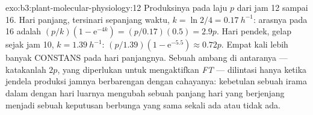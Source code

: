 \begin{solution}{exo:b3:plant-molecular-physiology:12}
Produksinya pada laju $p$ dari jam 12 sampai 16. Hari panjang, tersinari sepanjang waktu,
$k = \ln 2/4 = \qty{0.17}{h^{-1}}$: arasnya pada 16 adalah $(p/k)(1 -
\mathrm{e}^{-4k}) = (p/0.17)(0.5) = 2.9p$. Hari pendek, gelap sejak jam
10, $k = \qty{1.39}{h^{-1}}$: $(p/1.39)(1 - \mathrm{e}^{-5.5})
\approx 0.72p$. Empat kali lebih banyak CONSTANS pada hari panjangnya. Sebuah ambang
di antaranya --- katakanlah $2p$, yang diperlukan untuk mengaktifkan \emph{FT} --- dilintasi hanya
ketika jendela produksi jamnya berbarengan dengan cahayanya: kebetulan
sebuah irama dalam dengan hari luarnya mengubah sebuah panjang hari yang berjenjang
menjadi sebuah keputusan berbunga yang sama sekali ada atau tidak ada.
\end{solution}

